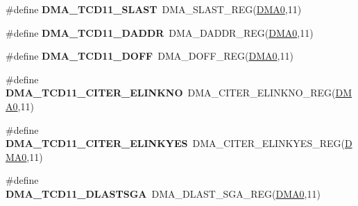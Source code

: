 \begin{DoxyCompactItemize}
\item 
\#define {\bfseries D\+M\+A\+\_\+\+T\+C\+D11\+\_\+\+S\+L\+A\+ST}~D\+M\+A\+\_\+\+S\+L\+A\+S\+T\+\_\+\+R\+EG(\hyperlink{group__DMA__Peripheral__Access__Layer_ga4103044f9ca209772f513dc694513ffb}{D\+M\+A0},11)\hypertarget{group__DMA__Register__Accessor__Macros_gabcae252b374277bc2405a856023d0393}{}\label{group__DMA__Register__Accessor__Macros_gabcae252b374277bc2405a856023d0393}

\item 
\#define {\bfseries D\+M\+A\+\_\+\+T\+C\+D11\+\_\+\+D\+A\+D\+DR}~D\+M\+A\+\_\+\+D\+A\+D\+D\+R\+\_\+\+R\+EG(\hyperlink{group__DMA__Peripheral__Access__Layer_ga4103044f9ca209772f513dc694513ffb}{D\+M\+A0},11)\hypertarget{group__DMA__Register__Accessor__Macros_ga85eb84f9db603a9914f8083f55c8091c}{}\label{group__DMA__Register__Accessor__Macros_ga85eb84f9db603a9914f8083f55c8091c}

\item 
\#define {\bfseries D\+M\+A\+\_\+\+T\+C\+D11\+\_\+\+D\+O\+FF}~D\+M\+A\+\_\+\+D\+O\+F\+F\+\_\+\+R\+EG(\hyperlink{group__DMA__Peripheral__Access__Layer_ga4103044f9ca209772f513dc694513ffb}{D\+M\+A0},11)\hypertarget{group__DMA__Register__Accessor__Macros_gac5dd3f7a538782a6fd6c61bd364a60b6}{}\label{group__DMA__Register__Accessor__Macros_gac5dd3f7a538782a6fd6c61bd364a60b6}

\item 
\#define {\bfseries D\+M\+A\+\_\+\+T\+C\+D11\+\_\+\+C\+I\+T\+E\+R\+\_\+\+E\+L\+I\+N\+K\+NO}~D\+M\+A\+\_\+\+C\+I\+T\+E\+R\+\_\+\+E\+L\+I\+N\+K\+N\+O\+\_\+\+R\+EG(\hyperlink{group__DMA__Peripheral__Access__Layer_ga4103044f9ca209772f513dc694513ffb}{D\+M\+A0},11)\hypertarget{group__DMA__Register__Accessor__Macros_ga8f6d29f6217fa5d8123a5ee867cd228f}{}\label{group__DMA__Register__Accessor__Macros_ga8f6d29f6217fa5d8123a5ee867cd228f}

\item 
\#define {\bfseries D\+M\+A\+\_\+\+T\+C\+D11\+\_\+\+C\+I\+T\+E\+R\+\_\+\+E\+L\+I\+N\+K\+Y\+ES}~D\+M\+A\+\_\+\+C\+I\+T\+E\+R\+\_\+\+E\+L\+I\+N\+K\+Y\+E\+S\+\_\+\+R\+EG(\hyperlink{group__DMA__Peripheral__Access__Layer_ga4103044f9ca209772f513dc694513ffb}{D\+M\+A0},11)\hypertarget{group__DMA__Register__Accessor__Macros_ga7a1d5152d02587612df16a045070a150}{}\label{group__DMA__Register__Accessor__Macros_ga7a1d5152d02587612df16a045070a150}

\item 
\#define {\bfseries D\+M\+A\+\_\+\+T\+C\+D11\+\_\+\+D\+L\+A\+S\+T\+S\+GA}~D\+M\+A\+\_\+\+D\+L\+A\+S\+T\+\_\+\+S\+G\+A\+\_\+\+R\+EG(\hyperlink{group__DMA__Peripheral__Access__Layer_ga4103044f9ca209772f513dc694513ffb}{D\+M\+A0},11)\hypertarget{group__DMA__Register__Accessor__Macros_ga0232d39a5ab4dc292b79d1980ebdce51}{}\label{group__DMA__Register__Accessor__Macros_ga0232d39a5ab4dc292b79d1980ebdce51}


\end{DoxyCompactItemize}

